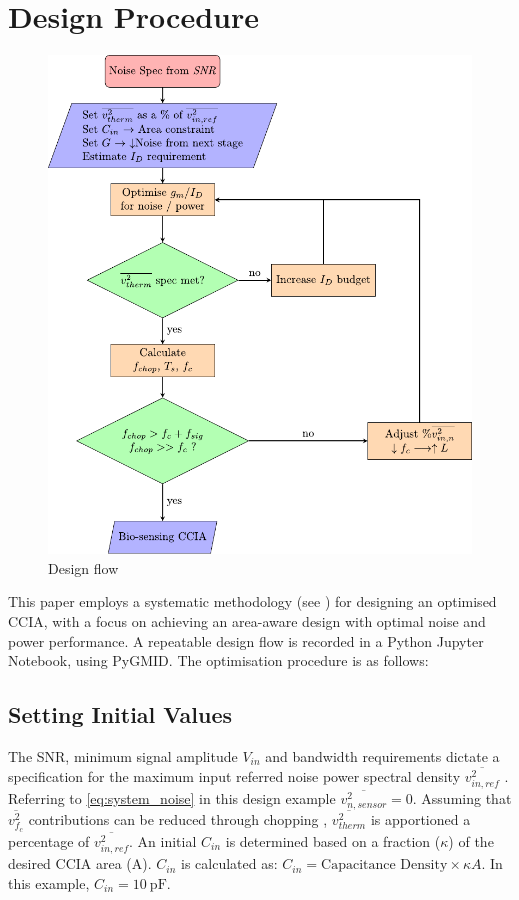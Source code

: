 \section{Design Procedure}\label{sec:methods}
\begin{figure}[!h]
    \centering
        \includegraphics[width=0.8\linewidth]{img/DesignFlow.pdf}
    \caption{Design flow}
    \label{fig:design flow}
\end{figure}

This paper employs a systematic methodology (see ) for designing an optimised CCIA, with a focus on achieving an area-aware design with optimal noise and power performance. A repeatable design flow is recorded in a Python Jupyter Notebook\cite{CCIA_GMID}, using PyGMID\cite{O_Donnell_PyGMID}. The optimisation procedure is as follows:
\subsection{Setting Initial Values}
The SNR, minimum signal amplitude ${V_{in}}$ and bandwidth requirements dictate a specification for the maximum input referred noise power spectral density $\overline{v_{in,ref}^2}$ . Referring to \cref{eq:system_noise} in this design example $\overline{v_{n,sensor}^2}=0$. Assuming that $\overline{v_{f_c}^2}$ contributions can be reduced through chopping \cite{Ha-8410446}, $\overline{v_{therm}^2}$ is apportioned a percentage of $\overline{v_{in,ref}^2}$. An initial $C_{in}$ is determined based on a fraction ($\kappa$) of the desired CCIA area (A). $C_{in}$ is calculated as: $C_{in}= \text{Capacitance Density} \times \kappa A$. In this example, $C_{in}=\SI{10}{\pico\farad}$.

